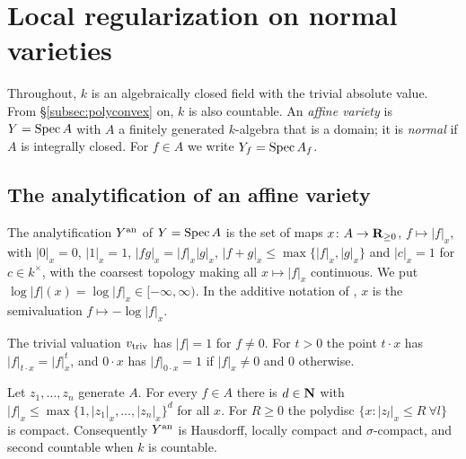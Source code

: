 \section{Local regularization on normal varieties}\label{sec:local-regularization}

\begin{convention}\label{conv:sec5}
Throughout, $k$ is an algebraically closed field with the trivial absolute value. From
\S\ref{subsec:polyconvex} on, $k$ is also countable. An \emph{affine variety} is $Y=\operatorname{Spec} A$
with $A$ a finitely generated $k$-algebra that is a domain; it is \emph{normal} if $A$ is
integrally closed. For $f\in A$ we write $Y_f=\operatorname{Spec} A_f$.
\end{convention}

\subsection{The analytification of an affine variety}\label{subsec:berk}

\begin{definition}\label{def:berk}
\leanok
The analytification $Y^{\mathrm{an}}$ of $Y=\operatorname{Spec} A$ is the set of maps $x\colon A\to\mathbf{R}_{\ge0}$,
$f\mapsto|f|_x$, with $|0|_x=0$, $|1|_x=1$, $|fg|_x=|f|_x|g|_x$,
$|f+g|_x\le\max\{|f|_x,|g|_x\}$ and $|c|_x=1$ for $c\in k^\times$, with the coarsest
topology making all $x\mapsto|f|_x$ continuous. We put $\log|f|(x)=\log|f|_x\in[-\infty,\infty)$.
In the additive notation of \cite{FHX}, $x$ is the semivaluation $f\mapsto-\log|f|_x$.
\end{definition}

\begin{definition}\label{def:triv-scaling}
\leanok
{}
The trivial valuation $v_{\mathrm{triv}}$ has $|f|=1$ for $f\ne0$. For $t>0$ the point $t\cdot x$ has
$|f|_{t\cdot x}=|f|_x^t$, and $0\cdot x$ has $|f|_{0\cdot x}=1$ if $|f|_x\ne0$ and $0$ otherwise.
\end{definition}

\begin{lemma}\label{lem:polydisc-compact}
\leanok
{}
Let $z_1,\dots,z_n$ generate $A$. For every $f\in A$ there is $d\in\mathbf{N}$ with
$|f|_x\le\max\{1,|z_1|_x,\dots,|z_n|_x\}^d$ for all $x$. For $R\ge0$ the polydisc
$\{x:|z_l|_x\le R\ \forall l\}$ is compact. Consequently $Y^{\mathrm{an}}$ is Hausdorff, locally compact and
$\sigma$-compact, and second countable when $k$ is countable.
\end{lemma}

